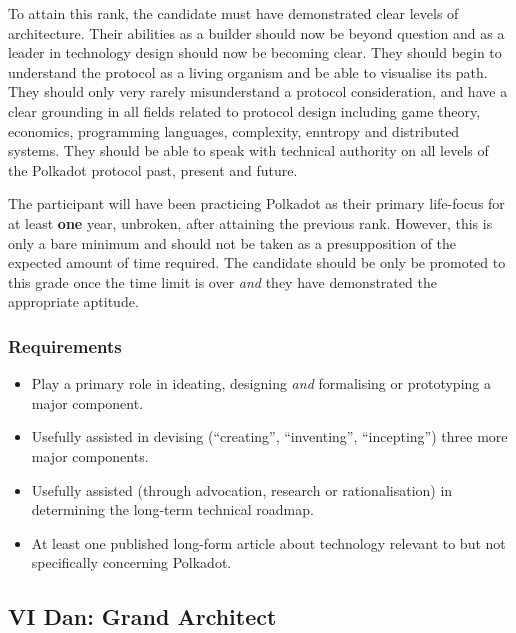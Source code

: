 \documentclass[9pt,oneside]{amsart}
\begin{document}
To attain this rank, the candidate must have demonstrated clear levels of architecture. Their abilities as a builder should now be beyond question and as a leader in technology design should now be becoming clear. They should begin to understand the protocol as a living organism and be able to visualise its path. They should only very rarely misunderstand a protocol consideration, and have a clear grounding in all fields related to protocol design including game theory, economics, programming languages, complexity, enntropy and distributed systems. They should be able to speak with technical authority on all levels of the Polkadot protocol past, present and future.

The participant will have been practicing Polkadot as their primary life-focus for at least \textbf{one} year, unbroken, after attaining the previous rank. However, this is only a bare minimum and should not be taken as a presupposition of the expected amount of time required. The candidate should be only be promoted to this grade once the time limit is over \emph{and} they have demonstrated the appropriate aptitude.

\subsubsection{Requirements}\label{requirements-5}

\begin{itemize}
\item Play a primary role in ideating, designing \emph{and} formalising or prototyping a major component.
\item Usefully assisted in devising (``creating'', ``inventing'', ``incepting'') three more major components.
\item Usefully assisted (through advocation, research or rationalisation) in determining the long-term technical roadmap.
\item At least one published long-form article about technology relevant to but not specifically concerning Polkadot.
\end{itemize}

\subsection{VI Dan: Grand Architect}\label{vi-dan-grand-architect}~\\

\end{document}
